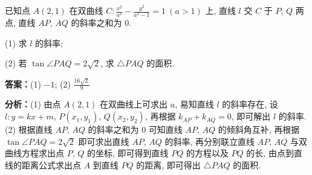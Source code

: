 \begin{question}[points=12]
已知点 $A(2,1)$ 在双曲线 $C: \frac{x^2}{a^2} - \frac{y^2}{a^2-1} = 1\ (a>1)$ 上, 直线 $l$ 交 $C$ 于 $P$, $Q$ 两点, 直线 $AP$, $AQ$ 的斜率之和为 $0$.

(1) 求 $l$ 的斜率;

(2) 若 $\tan\angle PAQ = 2\sqrt{2}$, 求 $\triangle PAQ$ 的面积.
\begin{solution}
\textbf{答案：}(1) $-1$; (2) $\frac{16\sqrt{2}}{9}$

\textbf{分析：}(1) 由点 $A(2,1)$ 在双曲线上可求出 $a$, 易知直线 $l$ 的斜率存在, 设 $l: y = kx + m$, $P(x_1, y_1)$, $Q(x_2, y_2)$, 再根据 $k_{AP} + k_{AQ} = 0$, 即可解出 $l$ 的斜率. (2) 根据直线 $AP$, $AQ$ 的斜率之和为 $0$ 可知直线 $AP$, $AQ$ 的倾斜角互补, 再根据 $\tan\angle PAQ = 2\sqrt{2}$ 即可求出直线 $AP$, $AQ$ 的斜率, 再分别联立直线 $AP$, $AQ$ 与双曲线方程求出点 $P$, $Q$ 的坐标, 即可得到直线 $PQ$ 的方程以及 $PQ$ 的长, 由点到直线的距离公式求出点 $A$ 到直线 $PQ$ 的距离, 即可得出 $\triangle PAQ$ 的面积.


\end{solution}
\end{question}
